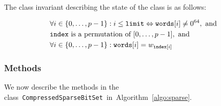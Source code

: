 \documentclass[a4paper,11pt]{article}
\newcommand{\Algoref}[1]{Algorithm~\ref{#1}}
\newcommand{\Words}{\texttt{words}}
\newcommand{\Index}{\texttt{index}}
\newcommand{\Limit}{\texttt{limit}}
\newcommand{\SparseBitSet}{\texttt{CompressedSparseBitSet}}
\numberwithin{equation}{section}
\begin{document}
\noindent
The class invariant describing the state of the class is as follows:

\begin{alignat}{1}
  \label{eq:invariant}
  &\forall i \in \Set{0,\dots,p-1}: i \leq \Limit \Leftrightarrow \Words[i] \neq 0^{64}, \text{~and} \\
  &\Index~\text{is a permutation of~} [0,\dots,p-1],\text{~and} \\
  &\forall i \in \Set{0,\dots,p-1}: \Words[i] = w_{\Index[i]}
\end{alignat}


\subsubsection{Methods}
We now describe the methods in the class~\SparseBitSet~in~\Algoref{algo:sparse}.
\end{document}
